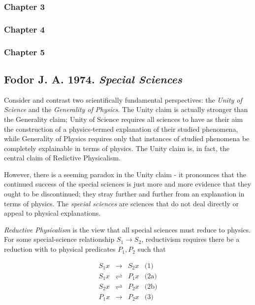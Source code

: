 \documentclass{article}
\newcommand{\tx}[1]{\text{#1}}
\newcommand{\ti}[1]{\textit{#1}}
\newcommand{\annbibtitle}[2]{\subsection*{#1. \ti{#2}}}
\begin{document}
\subsubsection*{Chapter 3}
\subsubsection*{Chapter 4}

\subsubsection*{Chapter 5}



\annbibtitle{Fodor J. A. 1974}{Special Sciences}

Consider and contrast two scientifically fundamental perspectives: the \ti{Unity of Science} and the \ti{Generality of Physics}. The Unity claim is actually stronger than the Generality claim; Unity of Science requires all sciences to have as their aim the construction of a physics-termed explanation of their studied phenomena, while Generality of Physics requires only that instances of studied phenomena be completely explainable in terms of physics. The Unity claim is, in fact, the central claim of Redictive Physicalism.

However, there is a seeming paradox in the Unity claim - it pronounces that the continued success of the special sciences is just more and more evidence that they ought to be discontinued; they stray further and further from an explanation in terms of physics. The \ti{special sciences} are sciences that do not deal directly or appeal to physical explanations.

\ti{Reductive Physicalism} is the view that all special sciences must reduce to physics. For some special-science relationship $S_1 \rightarrow S_2$, reductivism requires there be a reduction with to physical predicates $P_1, P_2$ such that

$$
\begin{array}{rcll}
    S_1 x & \rightarrow & S_2 x & \tx{(1)} \\
    S_1 x & \rightleftharpoons & P_1 x & \tx{(2a)} \\
    S_2 x & \rightleftharpoons & P_2 x & \tx{(2b)} \\
    P_1 x & \rightarrow & P_2 x & \tx{(3)}
\end{array}
$$
\end{document}
